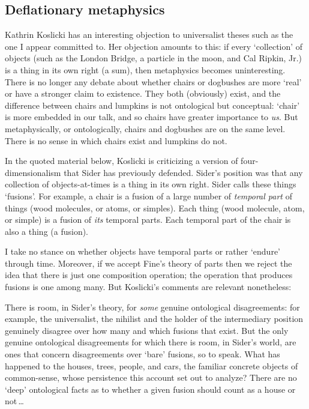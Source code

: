 \documentclass[11pt]{article}
\newenvironment{squote}{%
\begin{spacing}{1}
\begin{list}{}{%
\setlength{\labelwidth}{0pt}%
\rightmargin\leftmargin%
}
\item\relax
}{%
\end{list}%
\end{spacing}
}
\begin{document}
\begin{spacing}{1.5}
\subsection{Deflationary metaphysics}
\label{deflate}
Kathrin Koslicki has an interesting objection to universalist theses
such as the one I appear committed to.  Her objection amounts to this:
if every `collection' of objects (such as the London Bridge, a
particle in the moon, and Cal Ripkin, Jr.) is a thing in its own right
(a sum), then metaphysics becomes uninteresting.  There is no longer
any debate about whether chairs or dogbushes are more `real' or have a
stronger claim to existence.  They both (obviously) exist, and the
difference between chairs and lumpkins is not ontological but
conceptual: `chair' is more embedded in our talk, and so chairs have
greater importance to {\em us}.  But metaphysically, or ontologically,
chairs and dogbushes are on the same level.  There is no sense in
which chairs exist and lumpkins do not.

In the quoted material below, Koslicki is criticizing a version of
four-dimensionalism that Sider has previously defended.  Sider's
position was that any collection of objects-at-times is a thing in its
own right.  Sider calls these things `fusions'.  For example, a chair
is a fusion of a large number of {\em temporal part} of things (wood
molecules, or atoms, or simples).  Each thing (wood molecule, atom, or
simple) is a fusion of {\em its} temporal parts.  Each temporal part
of the chair is also a thing (a fusion).

I take no stance on whether objects have temporal parts or rather
`endure' through time.  Moreover, if we accept Fine's theory of parts
then we reject the idea that there is just one composition operation;
the operation that produces fusions is one among many.  But Koslicki's
comments are relevant nonetheless:

\begin{squote}
There is room, in Sider's theory, for {\em some} genuine ontological
disagreements: for example, the universalist, the nihilist and the
holder of the intermediary position genuinely disagree over how many
and which fusions that exist.  But the only genuine ontological
disagreements for which there is room, in Sider's world, are ones that
concern disagreements over `bare' fusions, so to speak.  What has
happened to the houses, trees, people, and cars, the familiar concrete
objects of common-sense, whose persistence this account set out to
analyze?  There are no `deep' ontological facts as to whether a given
fusion should count as a house or not\,\ldots


\end{squote}
\end{spacing}
\end{document}
